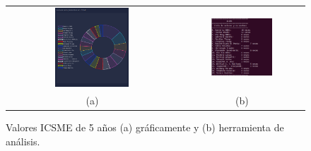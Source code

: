 \documentclass[a4paper, 12pt]{book}
\begin{document}
\begin{figure}[!h]
    \centering
    \begin{tabular}{cc}
    \includegraphics[width=0.45\textwidth]{img/icsme_5_year_graph.png} &  
    \includegraphics[width=0.52\textwidth]{img/icsme_5_year.png} \\ 
    (a) &(b) 
    \end{tabular}
    \caption{Valores ICSME de 5 años (a) gráficamente y (b) herramienta de análisis.}
    \label{fig:comp_icsme_5_year}
\end{figure}
\end{document}
